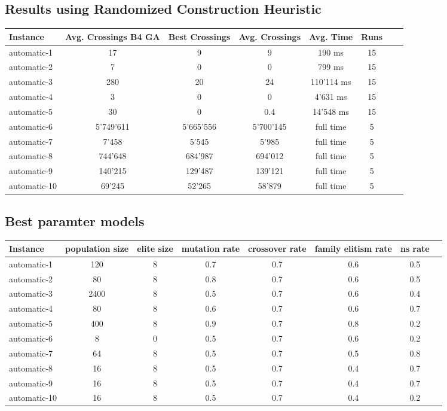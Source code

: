 \documentclass[11pt]{article}
\begin{document}
\subsection{Results using Randomized Construction Heuristic}

\begin{tabular}{l*{6}{c}r}
	Instance & Avg. Crossings B4 GA & Best Crossings & Avg. Crossings & Avg. Time & Runs \\
	\hline
	automatic-1 & 17 & 9 & 9 & 190 ms & 15 \\
	automatic-2 & 7 & 0 & 0 & 799 ms & 15 \\
	automatic-3 & 280 & 20 & 24 & 110'114 ms & 15 \\
	automatic-4 & 3 & 0 & 0 & 4'631 ms & 15 \\
	automatic-5 & 30 & 0 & 0.4 & 14'548 ms & 15 \\
	automatic-6 & 5'749'611 & 5'665'556 & 5'700'145 & full time & 5 \\
	automatic-7 & 7'458 & 5'545 & 5'985 & full time & 5 \\
	automatic-8 & 744'648 & 684'987 & 694'012 & full time & 5  \\
	automatic-9 & 140'215 & 129'487 & 139'121 & full time & 5 \\
	automatic-10 & 69'245 & 52'265 & 58'879 & full time & 5  \\
\end{tabular}

\subsection{Best paramter models}

\begin{tabular}{l*{6}{c}r}
	Instance & population size & elite size & mutation rate & crossover rate & family elitism rate & ns rate \\
	\hline
	automatic-1 & 120 & 8 & 0.7 & 0.7 & 0.6 & 0.5 \\
	automatic-2 & 80 & 8 & 0.8 & 0.7 & 0.6 & 0.5 \\
	automatic-3 & 2400 & 8 & 0.5 & 0.7 & 0.6 & 0.4 \\
	automatic-4 & 80 & 8 & 0.6 & 0.7 & 0.6 & 0.7 \\
	automatic-5 & 400 & 8 & 0.9 & 0.7 & 0.8 & 0.2 \\
	automatic-6 & 8 & 0 & 0.5 & 0.7 & 0.6 & 0.2 \\
	automatic-7 & 64 & 8 & 0.5 & 0.7 & 0.5 & 0.8 \\
	automatic-8 & 16 & 8 & 0.5 & 0.7 & 0.4 & 0.7 \\
	automatic-9 & 16 & 8 & 0.5 & 0.7 & 0.4 & 0.7 \\
	automatic-10 & 16 & 8 & 0.5 & 0.7 & 0.4 & 0.2 \\
\end{tabular}
\end{document}
